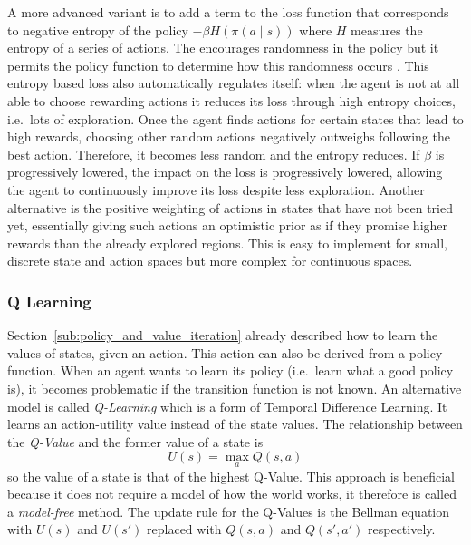 A more advanced variant is to add a term to the loss function that corresponds to negative entropy of the policy $-\beta
H(\pi(a \mid s ))$ where $H$ measures the entropy of a series of actions. The encourages randomness in the policy but
it permits the policy function to determine how this randomness occurs \citep{schmitt2018kickstarting}. This
entropy based loss also automatically regulates itself: when the agent is not at all able to choose rewarding actions
it reduces its loss through high entropy choices, i.e.\ lots of exploration. Once the agent finds actions for certain
states that lead to high rewards, choosing other random actions negatively outweighs following the best action.
Therefore, it becomes less random and the entropy reduces. If $\beta$ is progressively lowered, the impact on the loss
is progressively lowered, allowing the agent to continuously improve its loss despite less exploration.
Another alternative is the positive weighting of actions in states that have not been tried yet, essentially giving such
actions an optimistic prior as if they promise higher rewards than the already explored regions. This is easy to
implement for small, discrete state and action spaces but more complex for continuous spaces.



\subsubsection{Q Learning}%
\label{sub:q_learning}

Section~\ref{sub:policy_and_value_iteration} already described how to learn the values of states, given an
action. This action can also be derived from a policy function. When an agent wants to learn its policy
(i.e.\ learn what a good policy is), it becomes problematic if the transition function is not known. An alternative
model is called \emph{Q-Learning} which is a form of Temporal Difference Learning. It learns an action-utility value
instead of the state values. The relationship between the \emph{Q-Value} and the former value of a state is
\begin{equation}
    U(s) = \max_{a}Q(s,a)
\end{equation}
so the value of a state is that of the highest Q-Value. This approach is beneficial because it does not require a model
of how the world works, it therefore is called a \emph{model-free} method. The update rule for the Q-Values is
the Bellman equation with $U(s)$ and $U(s')$ replaced with $Q(s,a)$ and $Q(s',a')$ respectively.

